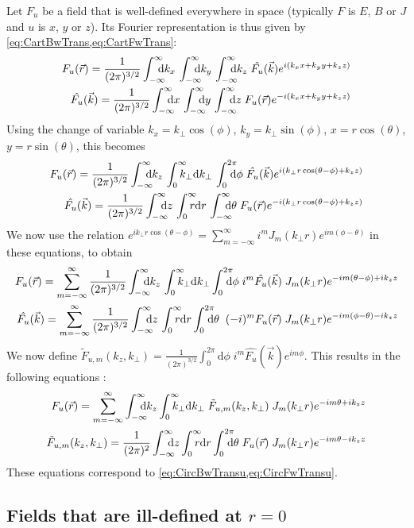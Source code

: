 Let $F_u$ be a field that is well-defined everywhere in space
(typically $F$ is $E$, $B$ or $J$ and $u$ is $x$, $y$ or $z$). Its Fourier representation
is thus given by \cref{eq:CartBwTrans,eq:CartFwTrans}:
\begin{align*}
F_u(\vec{r}) = \frac{1}{(2\pi)^{3/2}}\Integ{k_x} \,\Integ{k_y}\,
\Integ{k_z} \; \hat{F_u}(\vec{k}) e^{i(k_x x + k_y y + k_z z)} \\
\hat{F_u}(\vec{k})  = \frac{1}{(2\pi)^{3/2}}\Integ{x} \,\Integ{y}\,
\Integ{z} \; F_u(\vec{r}) e^{-i(k_x x + k_y y + k_z z)} 
\end{align*}
Using the change of variable $k_x=k_\perp\cos(\phi)$, $k_y = k_\perp\sin(\phi)$,
$x=r\cos(\theta)$, $y=r\sin(\theta)$, this becomes
 \begin{align*}
F_u(\vec{r}) = \frac{1}{(2\pi)^{3/2}}\Integ{k_z} \,\RInteg{k_\perp}\,
\TInteg{\phi} \; \hat{F_u}(\vec{k})
e^{i(k_\perp r \cos(\theta-\phi) + k_z z)} \\
\hat{F_u}(\vec{k})   = \frac{1}{(2\pi)^{3/2}}\Integ{z} \,\RInteg{r}\,
\Integ{\theta} \; F_u(\vec{r}) e^{-i(k_\perp r \cos(\theta-\phi) + k_z z)} 
\end{align*}
We now use the relation $e^{ik_\perp r\cos(\theta-\phi)} =
\sum_{m=-\infty}^{\infty} i^m J_m(k_\perp r) e^{im(\phi-\theta)}$ in these equations, to obtain
\begin{align*}
F_u (\vec{r})  = \sum_{m=-\infty}^{\infty} \frac{1}{(2\pi)^{3/2}}\Integ{k_z} \,\RInteg{k_\perp }
\TInteg{\phi} \; i^m \hat{F_u}(\vec{k}) \;
J_m(k_\perp r) e^{-im(\theta-\phi) + ik_z z} \\
\hat{F_u}(\vec{k})   =  \sum_{m=-\infty}^{\infty} \frac{1}{(2\pi)^{3/2}}\Integ{z} \,\RInteg{r}
\TInteg{\theta} \;\; (-i)^m F_u(\vec{r}) \; J_m(k_\perp r) e^{-im(\phi-\theta) -ik_z z} 
\end{align*}
We now define $\tilde{F}_{u,m}(k_z,k_\perp ) = \frac{1}{(2\pi)^{3/2}}\int_0^{2\pi}
\mathrm{d}\phi \; i^m \hat{F_u}(\vec{k})
e^{im\phi}$. This results in the following equations :
\begin{align*}
F_u(\vec{r}) = \sum_{m=-\infty}^{\infty} \Integ{k_z}
\RInteg{k_\perp }\; \tilde{F}_{u,m}(k_z,k_\perp ) \; J_m(k_\perp r) e^{-im\theta + ik_z z} 
\\
\tilde{F}_{u,m}(k_z,k_\perp ) = \frac{1}{(2\pi)^2} \Integ{z} \RInteg{r}
\TInteg{\theta} \;F_u(\vec{r})\; J_m(k_\perp r) e^{-im\theta
 - i k_z z}
\end{align*}
These equations correspond to \cref{eq:CircBwTransu,eq:CircFwTransu}.

\subsection{Fields that are ill-defined at $r=0$}

